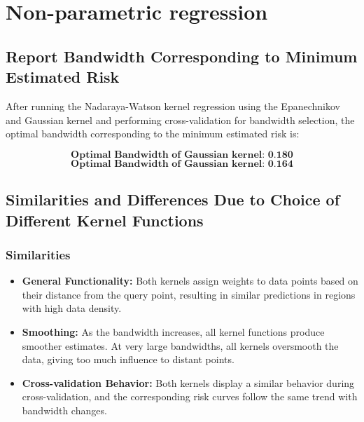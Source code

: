 \section{Non-parametric regression}
\subsection{Report Bandwidth Corresponding to Minimum Estimated Risk}

After running the Nadaraya-Watson kernel regression using the Epanechnikov and Gaussian kernel and performing cross-validation for bandwidth selection, the optimal bandwidth corresponding to the minimum estimated risk is:

\[
	\textbf{Optimal Bandwidth of Gaussian kernel: 0.180}
\]
\[
	\textbf{Optimal Bandwidth of Gaussian kernel: 0.164}
\]

\subsection{Similarities and Differences Due to Choice of Different Kernel Functions}

\subsubsection{Similarities}
\begin{itemize}
	\item \textbf{General Functionality:} Both kernels assign weights to data points based on their distance from the query point, resulting in similar predictions in regions with high data density.
	\item \textbf{Smoothing:} As the bandwidth increases, all kernel functions produce smoother estimates. At very large bandwidths, all kernels oversmooth the data, giving too much influence to distant points.
	\item \textbf{Cross-validation Behavior:} Both kernels display a similar behavior during cross-validation, and the corresponding risk curves follow the same trend with bandwidth changes.
\end{itemize}

